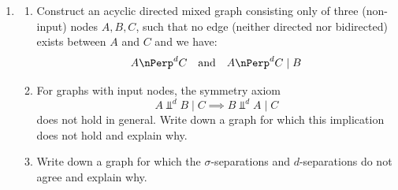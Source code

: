 \begin{enumerate}[label=5.\arabic*]
    \begin{ungradedsolution}
        \begin{enumerate}
            \item -
            \item
            \begin{enumerate}
                \item No, the walk $X_1 \to X_2 \to X_4 \to X_6$ is open because neither end points are in the conditioning set, $X_2$ is in the conditioning set but points to an element within its own strongly connected component, and $X_4$ points to another strongly connected component is not in the conditioning set.
                \item The walk $X_1\to X_4 \to X_6$ is open, so no.
                \item The walk $X_1\to X_4 \to X_6$ is open, so no.
            \end{enumerate}
        \end{enumerate}
    \end{ungradedsolution}

    \item
    \begin{enumerate}
        \item Construct an acyclic directed mixed graph consisting only of three (non-input) nodes $A,B,C$, such that no edge (neither directed nor bidirected) exists between $A$ and $C$ and we have:
        \[
            A \nPerp^d C \quad\text{and}\quad A \nPerp^d C \mid B
        \]
        \item %
        For graphs with input nodes, the symmetry axiom
        \[
            A \Perp^d B \mid C \implies B \Perp^d A \mid C
        \]
        does not hold in general. Write down a graph for which this implication does not hold and explain why.
        \item  %
        Write down a graph for which the $\sigma$-separations and $d$-separations do not agree and explain why.
    \end{enumerate}


\end{enumerate}

